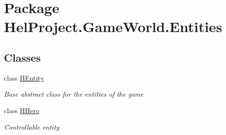 \hypertarget{namespace_hel_project_1_1_game_world_1_1_entities}{}\section{Package Hel\+Project.\+Game\+World.\+Entities}
\label{namespace_hel_project_1_1_game_world_1_1_entities}
\subsection*{Classes}
\begin{DoxyCompactItemize}
\item 
class \hyperlink{class_hel_project_1_1_game_world_1_1_entities_1_1_h_entity}{H\+Entity}
\begin{DoxyCompactList}\small\item\em Base abstract class for the entities of the game \end{DoxyCompactList}\item 
class \hyperlink{class_hel_project_1_1_game_world_1_1_entities_1_1_h_hero}{H\+Hero}
\begin{DoxyCompactList}\small\item\em Controllable entity \end{DoxyCompactList}\end{DoxyCompactItemize}
